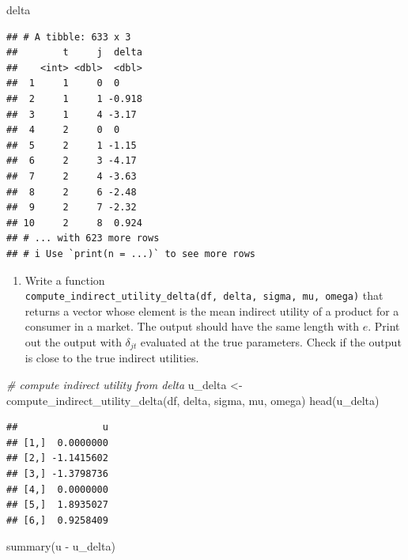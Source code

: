 \documentclass[
]{book}
\newenvironment{Shaded}{\begin{snugshade}}{\end{snugshade}}
\newcommand{\CommentTok}[1]{\textcolor[rgb]{0.56,0.35,0.01}{\textit{#1}}}
\newcommand{\FunctionTok}[1]{\textcolor[rgb]{0.00,0.00,0.00}{#1}}
\newcommand{\NormalTok}[1]{#1}
\newcommand{\OtherTok}[1]{\textcolor[rgb]{0.56,0.35,0.01}{#1}}
\newcommand{\SpecialCharTok}[1]{\textcolor[rgb]{0.00,0.00,0.00}{#1}}
\providecommand{\tightlist}{%
  \setlength{\itemsep}{0pt}\setlength{\parskip}{0pt}}
\begin{document}
\begin{Shaded}
\begin{Highlighting}[]
\NormalTok{delta}
\end{Highlighting}
\end{Shaded}

\begin{verbatim}
## # A tibble: 633 x 3
##        t     j  delta
##    <int> <dbl>  <dbl>
##  1     1     0  0    
##  2     1     1 -0.918
##  3     1     4 -3.17 
##  4     2     0  0    
##  5     2     1 -1.15 
##  6     2     3 -4.17 
##  7     2     4 -3.63 
##  8     2     6 -2.48 
##  9     2     7 -2.32 
## 10     2     8  0.924
## # ... with 623 more rows
## # i Use `print(n = ...)` to see more rows
\end{verbatim}

\begin{enumerate}
\def\labelenumi{\arabic{enumi}.}
\setcounter{enumi}{4}
\tightlist
\item
  Write a function \texttt{compute\_indirect\_utility\_delta(df,\ delta,\ sigma,\ mu,\ omega)} that returns a vector whose element is the mean indirect utility of a product for a consumer in a market. The output should have the same length with \(e\). Print out the output with \(\delta_{jt}\) evaluated at the true parameters. Check if the output is close to the true indirect utilities.
\end{enumerate}

\begin{Shaded}
\begin{Highlighting}[]
\CommentTok{\# compute indirect utility from delta}
\NormalTok{u\_delta }\OtherTok{\textless{}{-}}
  \FunctionTok{compute\_indirect\_utility\_delta}\NormalTok{(df, delta, sigma,}
\NormalTok{                                 mu, omega)}
\FunctionTok{head}\NormalTok{(u\_delta)}
\end{Highlighting}
\end{Shaded}

\begin{verbatim}
##               u
## [1,]  0.0000000
## [2,] -1.1415602
## [3,] -1.3798736
## [4,]  0.0000000
## [5,]  1.8935027
## [6,]  0.9258409
\end{verbatim}

\begin{Shaded}
\begin{Highlighting}[]
\FunctionTok{summary}\NormalTok{(u }\SpecialCharTok{{-}}\NormalTok{ u\_delta)}
\end{Highlighting}
\end{Shaded}
\end{document}
